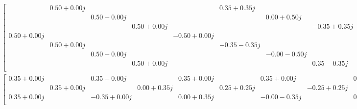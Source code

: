 \begin{gather*}
\begin{bmatrix}
            & 0.50+0.00j &            &            &            & 0.35+0.35j &            &            &            &-0.46-0.19j &            &            &            &-0.19-0.46j &            &            \\
            &            & 0.50+0.00j &            &            &            & 0.00+0.50j &            &            &            &-0.35-0.35j &            &            &            & 0.35-0.35j &            \\
            &            &            & 0.50+0.00j &            &            &            &-0.35+0.35j &            &            &            &-0.19-0.46j &            &            &            & 0.46+0.19j \\
 0.50+0.00j &            &            &            &-0.50+0.00j &            &            &            &-0.00-0.50j &            &            &            & 0.00+0.50j &            &            &            \\
            & 0.50+0.00j &            &            &            &-0.35-0.35j &            &            &            & 0.19-0.46j &            &            &            &-0.46+0.19j &            &            \\
            &            & 0.50+0.00j &            &            &            &-0.00-0.50j &            &            &            & 0.35-0.35j &            &            &            &-0.35-0.35j &            \\
            &            &            & 0.50+0.00j &            &            &            & 0.35-0.35j &            &            &            & 0.46-0.19j &            &            &            & 0.19-0.46j \\
\end{bmatrix}\\
\begin{bmatrix}
 0.35+0.00j &            & 0.35+0.00j &            & 0.35+0.00j &            & 0.35+0.00j &            & 0.35+0.00j &            & 0.35+0.00j &            & 0.35+0.00j &            & 0.35+0.00j &            \\
            & 0.35+0.00j &            & 0.00+0.35j &            & 0.25+0.25j &            &-0.25+0.25j &            & 0.33+0.14j &            &-0.14+0.33j &            & 0.14+0.33j &            &-0.33+0.14j \\
 0.35+0.00j &            &-0.35+0.00j &            & 0.00+0.35j &            &-0.00-0.35j &            & 0.25+0.25j &            &-0.25-0.25j &            &-0.25+0.25j &            & 0.25-0.25j &            \\

\end{bmatrix}
\end{gather*}
